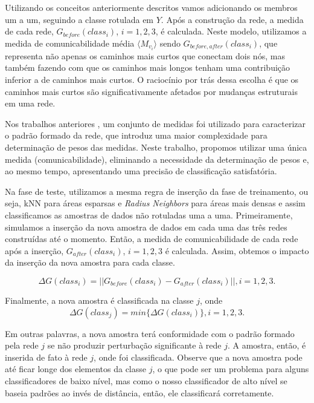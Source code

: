 \documentclass[
12pt,        %
oneside,     %
a4paper,     %
english,       %
brazil        %
%
%
]{ppgca}
\begin{document}
Utilizando os conceitos anteriormente descritos vamos adicionando os membros um a um, seguindo a classe rotulada em $Y$. 
Após a construção da rede, a medida de cada rede, $G_{before} (class_i)$, $i = 1, 2, 3$, é calculada. Neste modelo, utilizamos a medida de comunicabilidade média $\langle M_{v_i} \rangle$ \cite{Estrada2008} sendo $G_{before, after} (class_i)$, que representa não apenas os caminhos mais curtos que conectam dois nós, mas também fazendo com que os caminhos mais longos tenham uma contribuição inferior a de caminhos mais curtos. O raciocínio por trás dessa escolha é que os caminhos mais curtos são significativamente afetados por mudanças estruturais em uma rede. 

Nos trabalhos anteriores \cite{silva2012a, Colliri2018}, um conjunto de medidas foi utilizado para caracterizar o padrão formado da rede, que introduz uma maior complexidade para determinação de pesos das medidas. Neste trabalho, propomos utilizar uma única medida (comunicabilidade), eliminando a necessidade da determinação de pesos e, ao mesmo tempo, apresentando uma precisão de classificação satisfatória.

Na fase de teste, utilizamos a mesma regra de inserção da fase de treinamento, ou seja, kNN para áreas esparsas e \textit{Radius Neighbors} para áreas mais densas e assim classificamos as amostras de dados não rotuladas uma a uma. Primeiramente, simulamos a inserção da nova amostra de dados em cada uma das três redes construídas até o momento. Então, a medida de comunicabilidade de cada rede após a inserção, $G_{after} (class_i)$, $i = 1, 2, 3$ é calculada. 
Assim, obtemos o impacto da inserção da nova amostra para cada classe.

\begin{equation}
\Delta G (class_i) = || G_{before} (class_i) - G_{after} (class_i) ||, i = 1,2,3.
\end{equation}

Finalmente, a nova amostra é classificada na classe $j$, onde 
\begin{equation}
\Delta G (class_j) = min \{\Delta G (class_i) \}, i = 1,2,3.
\end{equation}

Em outras palavras, a nova amostra terá conformidade com o padrão formado pela rede $j$ se não produzir perturbação significante à rede $j$. A amostra, então, é inserida de fato à rede $j$, onde foi classificada. Observe que a nova amostra pode até ficar longe dos elementos da classe $j$, o que pode ser um problema para alguns classificadores de baixo nível, mas como o nosso classificador de alto nível se baseia padrões ao invés de distância, então, ele classificará corretamente.
\end{document}
